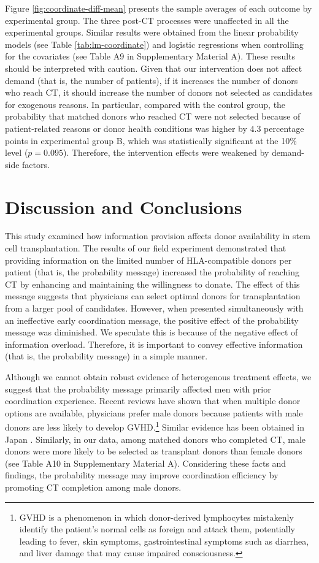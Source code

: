 \documentclass[12pt, a4paper]{article}
\begin{document}
Figure \ref{fig:coordinate-diff-mean} presents the sample averages of each outcome by experimental group. The three post-CT processes were unaffected in all the experimental groups. Similar results were obtained from the linear probability models (see Table \ref{tab:lm-coordinate}) and logistic regressions when controlling for the covariates (see Table A9 in Supplementary Material A). These results should be interpreted with caution. Given that our intervention does not affect demand (that is, the number of patients), if it increases the number of donors who reach CT, it should increase the number of donors not selected as candidates for exogenous reasons. In particular, compared with the control group, the probability that matched donors who reached CT were not selected because of patient-related reasons or donor health conditions was higher by \(4.3\) percentage points in experimental group B, which was statistically significant at the 10\% level (\(p = 0.095\)). Therefore, the intervention effects were weakened by demand-side factors.

\hypertarget{conclusion}{%
\section{Discussion and Conclusions}\label{conclusion}}

This study examined how information provision affects donor availability in stem cell transplantation. The results of our field experiment demonstrated that providing information on the limited number of HLA-compatible donors per patient (that is, the probability message) increased the probability of reaching CT by enhancing and maintaining the willingness to donate. The effect of this message suggests that physicians can select optimal donors for transplantation from a larger pool of candidates. However, when presented simultaneously with an ineffective early coordination message, the positive effect of the probability message was diminished. We speculate this is because of the negative effect of information overload. Therefore, it is important to convey effective information (that is, the probability message) in a simple manner.

Although we cannot obtain robust evidence of heterogenous treatment effects, we suggest that the probability message primarily affected men with prior coordination experience. Recent reviews have shown that when multiple donor options are available, physicians prefer male donors \citep{Fingrut2018} because patients with male donors are less likely to develop GVHD.\footnote{GVHD is a phenomenon in which donor-derived lymphocytes mistakenly identify the patient's normal cells as foreign and attack them, potentially leading to fever, skin symptoms, gastrointestinal symptoms such as diarrhea, and liver damage that may cause impaired consciousness.} Similar evidence has been obtained in Japan \citep{Shinohara2017}. Similarly, in our data, among matched donors who completed CT, male donors were more likely to be selected as transplant donors than female donors (see Table A10 in Supplementary Material A). Considering these facts and findings, the probability message may improve coordination efficiency by promoting CT completion among male donors.
\end{document}
